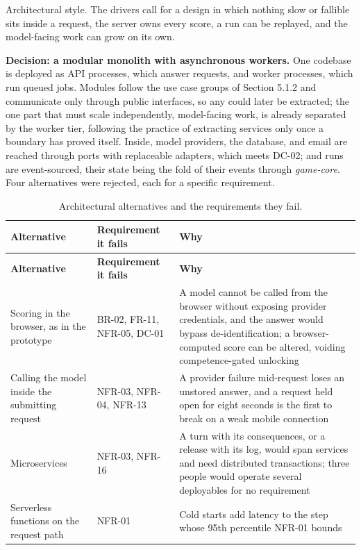 Architectural style. The drivers call for a design in which nothing slow or fallible sits inside a request, the server owns every score, a run can be replayed, and the model-\allowbreak{}facing work can grow on its own.

\textbf{Decision: a modular monolith with asynchronous workers.} One codebase is deployed as API processes, which answer requests, and worker processes, which run queued jobs. Modules follow the use case groups of Section 5.1.2 and communicate only through public interfaces, so any could later be extracted; the one part that must scale independently, model-\allowbreak{}facing work, is already separated by the worker tier, following the practice of extracting services only once a boundary has proved itself\cite{r163}. Inside, model providers, the database, and email are reached through ports with replaceable adapters\cite{r150}, which meets DC-02; and runs are event-\allowbreak{}sourced\cite{r164}, their state being the fold of their events through \textit{game-\allowbreak{}core}. Four alternatives were rejected, each for a specific requirement.

{\small{}\renewcommand{\arraystretch}{1.1}
\begin{longtable}{|>{\raggedright\arraybackslash}p{}|>{\raggedright\arraybackslash}p{}|>{\raggedright\arraybackslash}p{}|}
\caption{Architectural alternatives and the requirements they fail.} \\
\hline
\textbf{Alternative} & \textbf{Requirement it fails} & \textbf{Why} \\ \hline
\endfirsthead
\hline
\textbf{Alternative} & \textbf{Requirement it fails} & \textbf{Why} \\ \hline
\endhead
Scoring in the browser, as in the prototype & BR-02, FR-11, NFR-05, DC-01 & A model cannot be called from the browser without exposing provider credentials, and the answer would bypass de-\allowbreak{}identification; a browser-\allowbreak{}computed score can be altered, voiding competence-\allowbreak{}gated unlocking \\ \hline
Calling the model inside the submitting request & NFR-03, NFR-04, NFR-13 & A provider failure mid-request loses an unstored answer, and a request held open for eight seconds is the first to break on a weak mobile connection \\ \hline
Microservices & NFR-03, NFR-16 & A turn with its consequences, or a release with its log, would span services and need distributed transactions; three people would operate several deployables for no requirement \\ \hline
Serverless functions on the request path & NFR-01 & Cold starts add latency to the step whose 95th percentile NFR-01 bounds \\ \hline
\end{longtable}
}

